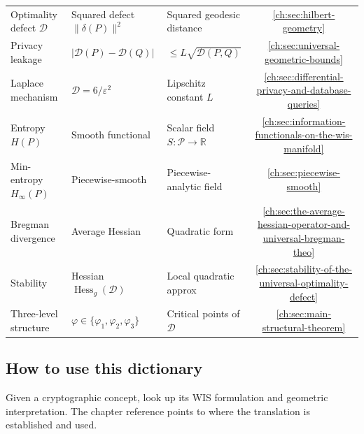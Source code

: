 \begin{center}
\begin{tabular}{p{3cm}p{3.5cm}p{3.5cm}c}
Optimality defect $\mathcal D$ & Squared defect $\|\delta(P)\|^2$ & Squared geodesic distance & \ref{ch:sec:hilbert-geometry} \\
Privacy leakage & $|\mathcal D(P)-\mathcal D(Q)|$ & $\le L\sqrt{\mathcal D(P,Q)}$ & \ref{ch:sec:universal-geometric-bounds} \\
Laplace mechanism & $\mathcal D=6/\varepsilon^2$ & Lipschitz constant $L$ & \ref{ch:sec:differential-privacy-and-database-queries} \\
Entropy $H(P)$ & Smooth functional & Scalar field $S:\mathcal P\to\mathbb R$ & \ref{ch:sec:information-functionals-on-the-wis-manifold} \\
Min-entropy $H_\infty(P)$ & Piecewise-smooth & Piecewise-analytic field & \ref{ch:sec:piecewise-smooth} \\
Bregman divergence & Average Hessian & Quadratic form & \ref{ch:sec:the-average-hessian-operator-and-universal-bregman-theo} \\
Stability & Hessian $\operatorname{Hess}_g(\mathcal D)$ & Local quadratic approx & \ref{ch:sec:stability-of-the-universal-optimality-defect} \\
Three-level structure & $\varphi\in\{\varphi_1,\varphi_2,\varphi_3\}$ & Critical points of $\mathcal D$ & \ref{ch:sec:main-structural-theorem} \\
\hline
\end{tabular}
\end{center}

\subsection*{How to use this dictionary}
Given a cryptographic concept, look up its WIS formulation and geometric
interpretation.  The chapter reference points to where the translation
is established and used.